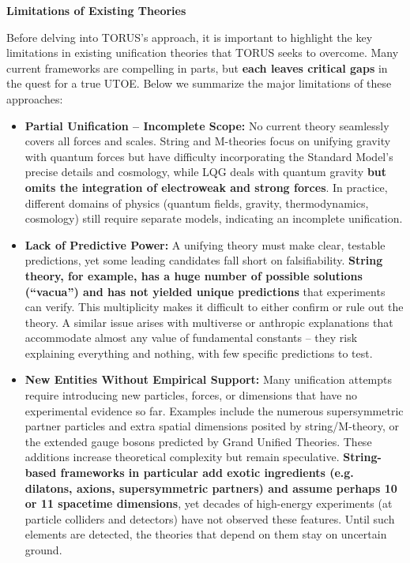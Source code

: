 \textbf{Limitations of Existing Theories}

Before delving into TORUS's approach, it is important to highlight the
key limitations in existing unification theories that TORUS seeks to
overcome. Many current frameworks are compelling in parts, but
\textbf{each leaves critical gaps} in the quest for a true UTOE. Below
we summarize the major limitations of these approaches:

\begin{itemize}
\item
  \textbf{Partial Unification -- Incomplete Scope:} No current theory
  seamlessly covers all forces and scales. String and M-theories focus
  on unifying gravity with quantum forces but have difficulty
  incorporating the Standard Model's precise details and cosmology,
  while LQG deals with quantum gravity \textbf{but omits the integration
  of electroweak and strong forces}​. In practice, different domains of
  physics (quantum fields, gravity, thermodynamics, cosmology) still
  require separate models, indicating an incomplete unification.
\item
  \textbf{Lack of Predictive Power:} A unifying theory must make clear,
  testable predictions, yet some leading candidates fall short on
  falsifiability. \textbf{String theory, for example, has a huge number
  of possible solutions (``vacua'') and has not yielded unique
  predictions} that experiments can verify. This multiplicity makes it
  difficult to either confirm or rule out the theory. A similar issue
  arises with multiverse or anthropic explanations that accommodate
  almost any value of fundamental constants -- they risk explaining
  everything and nothing, with few specific predictions to test.
\item
  \textbf{New Entities Without Empirical Support:} Many unification
  attempts require introducing new particles, forces, or dimensions that
  have no experimental evidence so far. Examples include the numerous
  supersymmetric partner particles and extra spatial dimensions posited
  by string/M-theory, or the extended gauge bosons predicted by Grand
  Unified Theories. These additions increase theoretical complexity but
  remain speculative. \textbf{String-based frameworks in particular add
  exotic ingredients (e.g. dilatons, axions, supersymmetric partners)
  and assume perhaps 10 or 11 spacetime dimensions}​, yet decades of
  high-energy experiments (at particle colliders and detectors) have not
  observed these features. Until such elements are detected, the
  theories that depend on them stay on uncertain ground.

\end{itemize}
